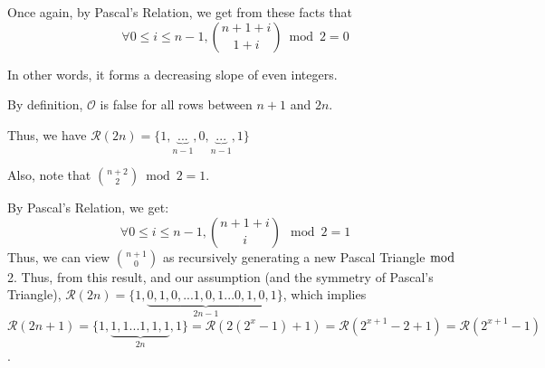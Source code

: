 \documentclass{article}
\newcommand{\pred}{\mathcal{O}}
\newcommand{\modrow}{\mathcal{R}}
\begin{document}
Once again, by Pascal's Relation, we get from these facts that
$$\forall 0 \leq i \leq {n - 1}, {{n+1 + i} \choose {1 + i}} \bmod 2 = 0$$

In other words, it forms a decreasing slope of even integers.

By definition, $\pred$ is false for all rows between $n+1$ and $2n$.

Thus, we have $\modrow(2n)=\{1,\underbrace{...}_{n-1},0,\underbrace{...}_{n-1},1\}$

Also, note that ${n+2 \choose 2} \bmod 2 = 1$.

By Pascal's Relation, we get: 
$$\forall 0 \leq i \leq {n-1}, {{n+1+i} \choose i} \mod 2 = 1$$
Thus, we can view ${n+1 \choose 0}$ as recursively generating a new Pascal Triangle $\bmod$ 2. Thus, from this result, and our assumption (and the symmetry of Pascal's Triangle), $\modrow(2n) = \{1,\underbrace{0,1,0,...1,0,1...0,1,0}_{2n-1},1\}$, which implies $\modrow(2n+1) = \{1,\underbrace{1,1...1,1,1}_{2n},1\} = \modrow(2(2^x-1)+1) = \modrow(2^{x+1}-2+1) =
\modrow(2^{x+1}-1)$.
\end{document}
